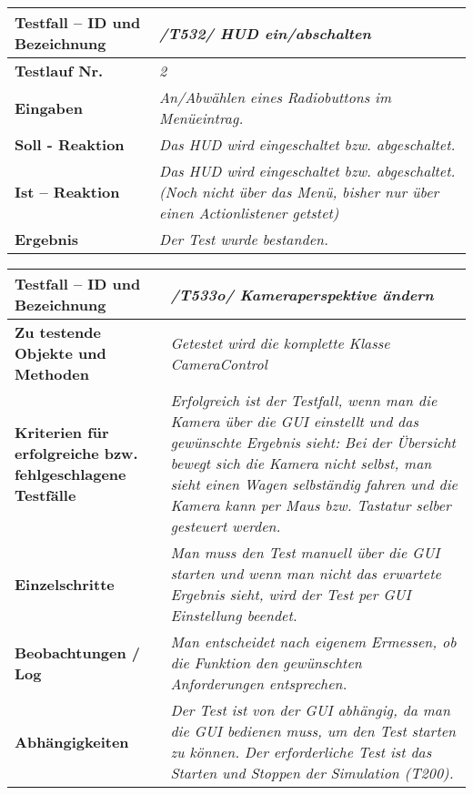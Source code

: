 \begin{longtable}{|p{7cm}|p{10cm}|}
\hline
\textbf{Testfall -- ID und Bezeichnung} & \textit{/T532/ HUD ein/abschalten} \\
\hline
\textbf{Testlauf Nr.} & \textit{2} \\
\hline
\textbf{Eingaben} & \textit{An/Abwählen eines Radiobuttons im Menüeintrag.} \\
\hline
\textbf{Soll - Reaktion} & \textit{Das HUD wird eingeschaltet bzw. abgeschaltet.} \\
\hline
\textbf{Ist -- Reaktion} & \textit{Das HUD wird eingeschaltet bzw. abgeschaltet.(Noch nicht über das Menü, bisher nur über einen Actionlistener getstet)} \\
\hline
\textbf{Ergebnis} & \textit{Der Test wurde bestanden.} \\
\hline
\end{longtable}


\begin{longtable}{|p{7cm}|p{10cm}|}
\hline
\textbf{Testfall -- ID und Bezeichnung} &  \textit{/T533o/ Kameraperspektive ändern} \\
\hline
\textbf{Zu testende Objekte und Methoden} &  \textit{Getestet wird die komplette Klasse CameraControl}
\\
\hline
\textbf{Kriterien für erfolgreiche bzw. fehlgeschlagene Testfälle} &
\textit{Erfolgreich ist der Testfall, wenn man die Kamera über die GUI einstellt und das gewünschte Ergebnis sieht: Bei der Übersicht bewegt sich die Kamera nicht selbst, man sieht einen Wagen selbständig fahren und die Kamera kann per Maus bzw. Tastatur selber gesteuert werden. } \\
\hline
\textbf{Einzelschritte} &  \textit{Man muss den Test manuell über die GUI starten und wenn man nicht das erwartete Ergebnis sieht, wird der Test per GUI Einstellung beendet.} \\
\hline
\textbf{Beobachtungen / Log} &  \textit{Man entscheidet nach eigenem Ermessen, ob die Funktion den gewünschten Anforderungen entsprechen.} \\
\hline
\textbf{Abhängigkeiten} &  \textit{Der Test ist von der GUI abhängig, da man die GUI bedienen muss, um den Test starten zu können. Der erforderliche Test ist das Starten und Stoppen der Simulation (T200).} \\
\hline
\end{longtable}

